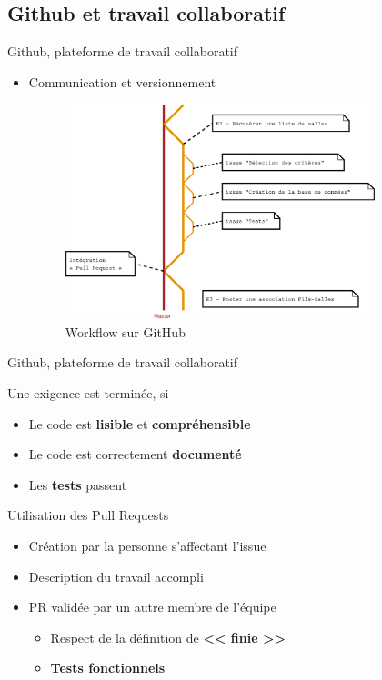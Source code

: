 	\subsection{Github  et travail collaboratif}	%
	\begin{frame}{Github, plateforme de travail collaboratif} %
		\begin{itemize}
			\item Communication et versionnement
			\begin{figure}
				\centering
				\includegraphics[width=9cm]{./images/workflow_github}
				\caption{Workflow sur GitHub}
				\label{fig:workflow_github}
			\end{figure}
		\end{itemize}
	\end{frame}

	\begin{frame}{Github, plateforme de travail collaboratif} %
		\begin{block}{Une exigence est terminée, si}
			\begin{itemize}
				\item Le code est \textbf{lisible} et \textbf{compréhensible}
				\item Le code est correctement \textbf{documenté}
				\item Les \textbf{tests} passent \cmark
			\end{itemize} 
		\end{block}
		\pause

		\begin{block}{Utilisation des Pull Requests}
			\begin{itemize}
				\item Création par la personne s'affectant l'issue
				\item Description du travail accompli
				\item PR validée par un autre membre de l'équipe
					\begin{itemize}
						\item Respect de la définition de \textbf{<< finie >>}
						\item \textbf{Tests fonctionnels} \cmark
					\end{itemize}
			\end{itemize}
		\end{block}
	\end{frame}

	\AntoineSpeak
